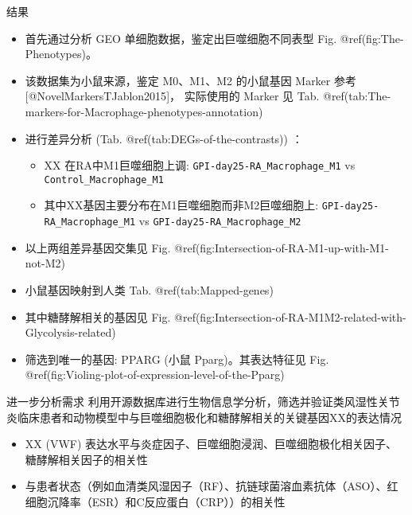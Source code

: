 \documentclass[
  ignorenonframetext,
]{beamer}
\providecommand{\tightlist}{%
  \setlength{\itemsep}{0pt}\setlength{\parskip}{0pt}}
\begin{document}
\begin{frame}[fragile]{结果}
\protect\hypertarget{ux7ed3ux679c}{}
\begin{itemize}
\tightlist
\item
  首先通过分析 GEO 单细胞数据，鉴定出巨噬细胞不同表型 Fig.
  @ref(fig:The-Phenotypes)。
\item
  该数据集为小鼠来源，鉴定 M0、M1、M2 的小鼠基因 Marker
  参考{[}@NovelMarkersTJablon2015{]}， 实际使用的 Marker 见 Tab.
  @ref(tab:The-markers-for-Macrophage-phenotypes-annotation)
\item
  进行差异分析 (Tab. @ref(tab:DEGs-of-the-contrasts)) ：

  \begin{itemize}
  \tightlist
  \item
    XX 在RA中M1巨噬细胞上调: \texttt{GPI-day25-RA\_Macrophage\_M1} vs
    \texttt{Control\_Macrophage\_M1}
  \item
    其中XX基因主要分布在M1巨噬细胞而非M2巨噬细胞上:
    \texttt{GPI-day25-RA\_Macrophage\_M1} vs
    \texttt{GPI-day25-RA\_Macrophage\_M2}
  \end{itemize}
\item
  以上两组差异基因交集见 Fig.
  @ref(fig:Intersection-of-RA-M1-up-with-M1-not-M2)
\item
  小鼠基因映射到人类 Tab. @ref(tab:Mapped-genes)
\item
  其中糖酵解相关的基因见 Fig.
  @ref(fig:Intersection-of-RA-M1M2-related-with-Glycolysis-related)
\item
  筛选到唯一的基因: PPARG (小鼠 Pparg)。其表达特征见 Fig.
  @ref(fig:Violing-plot-of-expression-level-of-the-Pparg)
\end{itemize}
\end{frame}

\begin{frame}{进一步分析需求}
\protect\hypertarget{ux8fdbux4e00ux6b65ux5206ux6790ux9700ux6c42}{}
利用开源数据库进行生物信息学分析，筛选并验证类风湿性关节炎临床患者和动物模型中与巨噬细胞极化和糖酵解相关的关键基因XX的表达情况

\begin{itemize}
\tightlist
\item
  XX (VWF)
  表达水平与炎症因子、巨噬细胞浸润、巨噬细胞极化相关因子、糖酵解相关因子的相关性
\item
  与患者状态（例如血清类风湿因子（RF）、抗链球菌溶血素抗体（ASO）、红细胞沉降率（ESR）和C反应蛋白（CRP））的相关性
\end{itemize}
\end{frame}
\end{document}
